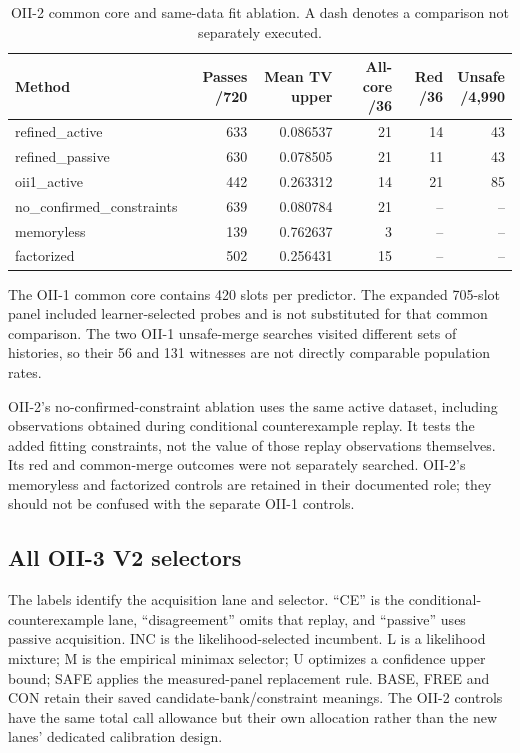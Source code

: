 

\begin{table}[tbp]
\centering
\caption{OII-2 common core and same-data fit ablation. A dash denotes a comparison not separately executed.}\label{tab:oii2}
\footnotesize
\setlength{\tabcolsep}{5pt}
\begin{tabular}{lrrrrr}
\toprule
Method & Passes /720 & Mean TV upper & All-core /36 & Red /36 & \shortstack{Unsafe\\/4,990} \\
\midrule
refined\_active & 633 & 0.086537 & 21 & 14 & 43 \\
refined\_passive & 630 & 0.078505 & 21 & 11 & 43 \\
oii1\_active & 442 & 0.263312 & 14 & 21 & 85 \\
no\_confirmed\_constraints & 639 & 0.080784 & 21 & -- & -- \\
memoryless & 139 & 0.762637 & 3 & -- & -- \\
factorized & 502 & 0.256431 & 15 & -- & -- \\
\bottomrule
\end{tabular}
\end{table}


\FloatBarrier
The OII-1 common core contains 420 slots per predictor. The expanded 705-slot panel included learner-selected probes and is not substituted for that common comparison. The two OII-1 unsafe-merge searches visited different sets of histories, so their 56 and 131 witnesses are not directly comparable population rates.

OII-2's no-confirmed-constraint ablation uses the same active dataset, including observations obtained during conditional counterexample replay. It tests the added fitting constraints, not the value of those replay observations themselves. Its red and common-merge outcomes were not separately searched. OII-2's memoryless and factorized controls are retained in their documented role; they should not be confused with the separate OII-1 controls.

\subsection{All OII-3 V2 selectors}
The labels identify the acquisition lane and selector. ``CE'' is the conditional-counterexample lane, ``disagreement'' omits that replay, and ``passive'' uses passive acquisition. INC is the likelihood-selected incumbent. L is a likelihood mixture; M is the empirical minimax selector; U optimizes a confidence upper bound; SAFE applies the measured-panel replacement rule. BASE, FREE and CON retain their saved candidate-bank/constraint meanings. The OII-2 controls have the same total call allowance but their own allocation rather than the new lanes' dedicated calibration design.

